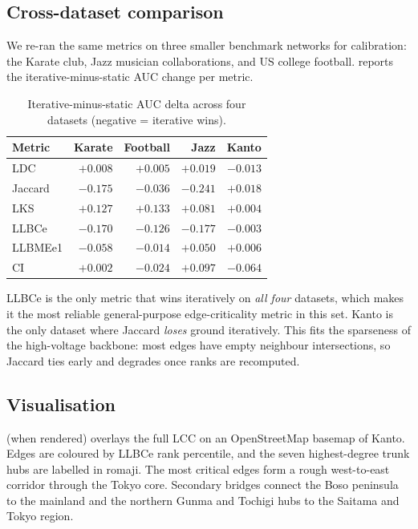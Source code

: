 \documentclass[11pt,a4paper]{article}
\begin{document}
\subsection{Cross-dataset comparison}
We re-ran the same metrics on three smaller benchmark networks for
calibration: the Karate club, Jazz musician collaborations, and US
college football.  reports the iterative-minus-static
AUC change per metric.

\begin{table}[h]
\centering
\small
\caption{Iterative-minus-static AUC delta across four datasets
(negative = iterative wins).}
\label{tab:xdataset}
\begin{tabular}{lrrrr}
\toprule
Metric & Karate & Football & Jazz & Kanto \\
\midrule
LDC      & $+0.008$ & $+0.005$ & $+0.019$ & $-0.013$ \\
Jaccard  & $-0.175$ & $-0.036$ & $-0.241$ & $+0.018$ \\
LKS      & $+0.127$ & $+0.133$ & $+0.081$ & $+0.004$ \\
LLBCe    & $-0.170$ & $-0.126$ & $-0.177$ & $-0.003$ \\
LLBMEe1  & $-0.058$ & $-0.014$ & $+0.050$ & $+0.006$ \\
CI       & $+0.002$ & $-0.024$ & $+0.097$ & $-0.064$ \\
\bottomrule
\end{tabular}
\end{table}

LLBCe is the only metric that wins iteratively on \emph{all four}
datasets, which makes it the most reliable general-purpose
edge-criticality metric in this set. Kanto is the only dataset where
Jaccard \emph{loses} ground iteratively. This fits the sparseness of the
high-voltage backbone: most edges have empty neighbour intersections, so
Jaccard ties early and degrades once ranks are recomputed.

\subsection{Visualisation}
 (when rendered) overlays the full LCC on an
OpenStreetMap basemap of Kanto. Edges are coloured by LLBCe rank
percentile, and the seven highest-degree trunk hubs are labelled in
romaji. The most critical edges form a rough west-to-east corridor
through the Tokyo core. Secondary bridges connect the Boso peninsula to
the mainland and the northern Gunma and Tochigi hubs to the Saitama and
Tokyo region.
\end{document}
